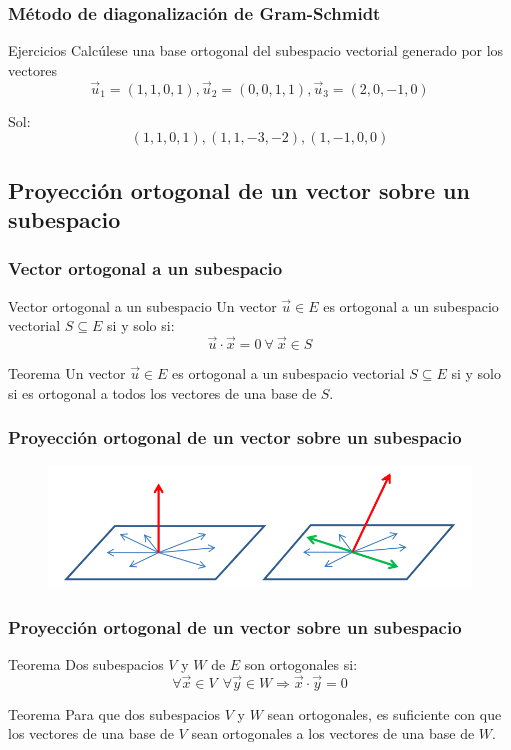 \documentclass{beamer}
\begin{document}
\begin{frame}
  \frametitle{M\'etodo de diagonalizaci\'on de Gram-Schmidt}
\begin{block}{Ejercicios}
Calc\'ulese una base ortogonal del subespacio vectorial generado por los vectores
\[\vec u_1 = (1,1,0,1), \vec u_2 = (0,0,1,1), \vec u_3 = (2,0,-1,0)\]
\end{block}
Sol: 
\[(1,1,0,1),(1,1,-3,-2),(1,-1,0,0)\]
\end{frame}

\subsection{Proyecci\'on ortogonal de un vector sobre un subespacio}
\begin{frame}
  \frametitle{Vector ortogonal a un subespacio}
\begin{block}{Vector ortogonal a un subespacio}
Un vector $\vec u\in E$ es ortogonal a un subespacio vectorial $S\subseteq E$ si y solo si: 
\[\vec u \cdot \vec x = 0\ \forall\ \vec x \in S\]
\end{block}

\begin{block}{Teorema}
Un vector $\vec u\in E$ es ortogonal a un subespacio vectorial $S\subseteq E$ si y solo si es ortogonal a todos los vectores de una base de $S$.
\end{block}
\end{frame}

\begin{frame}
  \frametitle{Proyecci\'on ortogonal de un vector sobre un subespacio}
\begin{figure}[h]
  \label{fig:esquema}
\centering
\includegraphics[width=\textwidth]{ortogonal}
\end{figure}
\end{frame}




\begin{frame}
  \frametitle{Proyecci\'on ortogonal de un vector sobre un subespacio}
\begin{block}{Teorema}
Dos subespacios $V$ y $W$ de $E$ son ortogonales si: 
\[\forall \vec x\in V\ \ \forall \vec y \in W \Rightarrow \vec x \cdot \vec y = 0\]
\end{block}

\begin{block}{Teorema}
Para que dos subespacios $V$ y $W$ sean ortogonales, es suficiente con que los vectores de una base de $V$ sean ortogonales a los vectores de una base de $W$.
\end{block}
\end{frame}
\end{document}
